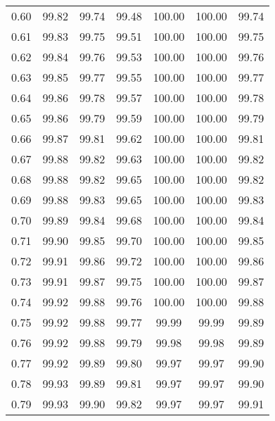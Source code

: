 \begin{tabular}{|c|c|c|c|c|c|c|}
      0.60 &     99.82 &     99.74 &      99.48 &  100.00 &     100.00 &         99.74 \\
      0.61 &     99.83 &     99.75 &      99.51 &  100.00 &     100.00 &         99.75 \\
      0.62 &     99.84 &     99.76 &      99.53 &  100.00 &     100.00 &         99.76 \\
      0.63 &     99.85 &     99.77 &      99.55 &  100.00 &     100.00 &         99.77 \\
      0.64 &     99.86 &     99.78 &      99.57 &  100.00 &     100.00 &         99.78 \\
      0.65 &     99.86 &     99.79 &      99.59 &  100.00 &     100.00 &         99.79 \\
      0.66 &     99.87 &     99.81 &      99.62 &  100.00 &     100.00 &         99.81 \\
      0.67 &     99.88 &     99.82 &      99.63 &  100.00 &     100.00 &         99.82 \\
      0.68 &     99.88 &     99.82 &      99.65 &  100.00 &     100.00 &         99.82 \\
      0.69 &     99.88 &     99.83 &      99.65 &  100.00 &     100.00 &         99.83 \\
      0.70 &     99.89 &     99.84 &      99.68 &  100.00 &     100.00 &         99.84 \\
      0.71 &     99.90 &     99.85 &      99.70 &  100.00 &     100.00 &         99.85 \\
      0.72 &     99.91 &     99.86 &      99.72 &  100.00 &     100.00 &         99.86 \\
      0.73 &     99.91 &     99.87 &      99.75 &  100.00 &     100.00 &         99.87 \\
      0.74 &     99.92 &     99.88 &      99.76 &  100.00 &     100.00 &         99.88 \\
      0.75 &     99.92 &     99.88 &      99.77 &   99.99 &      99.99 &         99.89 \\
      0.76 &     99.92 &     99.88 &      99.79 &   99.98 &      99.98 &         99.89 \\
      0.77 &     99.92 &     99.89 &      99.80 &   99.97 &      99.97 &         99.90 \\
      0.78 &     99.93 &     99.89 &      99.81 &   99.97 &      99.97 &         99.90 \\
      0.79 &     99.93 &     99.90 &      99.82 &   99.97 &      99.97 &         99.91 \\

\end{tabular}
